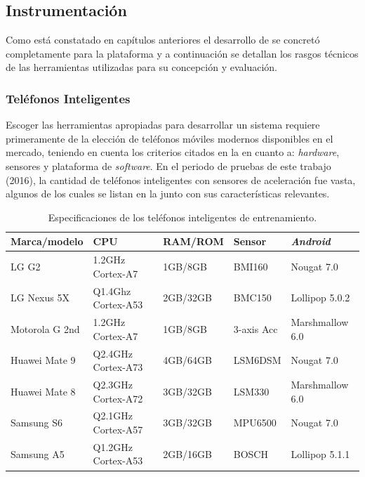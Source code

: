 \subsection{Instrumentación}

\label{ssec6:instrumentacion}Como está constatado en capítulos anteriores
el desarrollo de \emph{ }se concretó completamente
para la plataforma \emph{ }y a continuación se detallan
los rasgos técnicos de las herramientas utilizadas para su concepción
y evaluación.

\subsubsection{Teléfonos Inteligentes}

Escoger las herramientas apropiadas para desarrollar un sistema 
requiere primeramente de la elección de teléfonos móviles modernos
disponibles en el mercado, teniendo en cuenta los criterios citados
en la  en cuanto a: \emph{hardware},
sensores y plataforma de \emph{software}. En el periodo de pruebas
de este trabajo (2016), la cantidad de teléfonos inteligentes con
sensores de aceleración fue vasta, algunos de los cuales se listan
en la  junto con sus características relevantes.

\begin{table}[h]
\begin{centering}
\begin{tabular}{|l|>{\raggedright}p{2.5cm}|l|>{\raggedright}p{2cm}|l|}
\hline 
Marca/modelo & CPU & RAM/ROM & Sensor & \emph{Android}\tabularnewline
\hline 
\hline 
LG G2 & 1.2GHz Cortex-A7 & 1GB/8GB & BMI160 & Nougat 7.0\tabularnewline
\hline 
LG Nexus 5X & Q1.4Ghz Cortex-A53 & 2GB/32GB & BMC150 & Lollipop 5.0.2\tabularnewline
\hline 
Motorola G 2nd & 1.2GHz Cortex-A7 & 1GB/8GB & 3-axis Acc & Marshmallow 6.0\tabularnewline
\hline 
Huawei Mate 9 & Q2.4GHz Cortex-A73 & 4GB/64GB & LSM6DSM & Nougat 7.0\tabularnewline
\hline 
Huawei Mate 8 & Q2.3GHz Cortex-A72 & 3GB/32GB & LSM330  & Marshmallow 6.0\tabularnewline
\hline 
Samsung S6 & Q2.1GHz Cortex-A57 & 3GB/32GB & MPU6500 & Nougat 7.0\tabularnewline
\hline 
Samsung A5 & Q1.2GHz Cortex-A53  & 2GB/16GB & BOSCH & Lollipop 5.1.1\tabularnewline
\hline 
\end{tabular}
\par\end{centering}
\caption[Especificaciones de teléfonos inteligentes]{\label{tab6:dispositivos}Especificaciones de los teléfonos inteligentes
de entrenamiento.}
\end{table}

